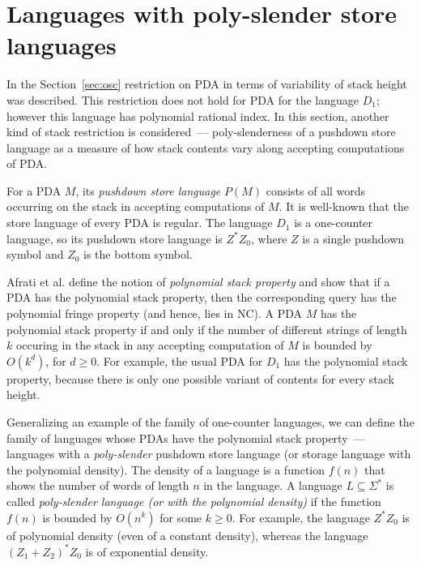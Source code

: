 \section{Languages with poly-slender store languages}
\label{sec:poly}
In the Section~\ref{sec:osc} restriction on PDA in terms of variability of stack height was described. This restriction does not hold for PDA for the language $D_1$; however this language has polynomial rational index. In this section, another kind of stack restriction is considered~--- poly-slenderness of a pushdown store language as a measure of how stack contents vary along accepting computations of PDA.


For a PDA $M$, its \textit{pushdown store language} $P(M)$ consists of all words
occurring on the stack in accepting computations of $M$. It is well-known that the store language of every PDA is regular. The language $D_1$ is a one-counter language, so its pushdown store language is $Z^*Z_0$, where $Z$ is a single pushdown symbol and $Z_0$ is the bottom symbol.


Afrati et al. \cite{ChainQ} define the notion of \textit{polynomial stack property} and show that if a PDA has the polynomial stack property, then the corresponding query has the polynomial fringe property (and hence, lies in NC). A PDA $M$ has the polynomial stack property if and only if the number of different strings of length $k$ occuring in the stack in any accepting computation of $M$ is bounded by $O(k^d)$,  for $d \ge 0$. For example, the usual PDA for $D_1$ has the polynomial stack property, because there is only one possible variant of contents for every stack height. 


Generalizing an example of the family of one-counter languages, we can define the family of languages whose PDAs have the polynomial stack property~--- languages with a \textit{poly-slender} pushdown store language (or storage language with the polynomial density). The density of a language is a function $f(n)$ that shows the number of words of length $n$ in the language. A language $L \subseteq \Sigma^*$ is called \textit{poly-slender language (or with the polynomial density)} if the function $f(n)$ is bounded by $O(n^k)$ for some $k \ge 0$. For example, the language $Z^*Z_0$ is of polynomial density (even of a constant density), whereas the language ${(Z_1 + Z_2)}^*Z_0$ is of exponential density.


